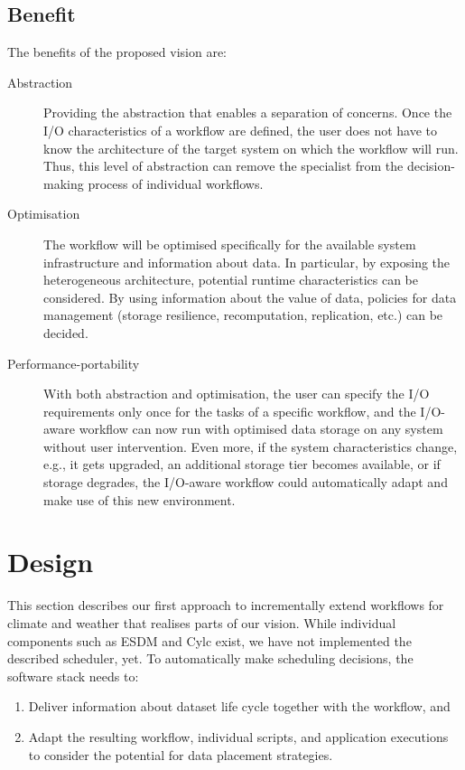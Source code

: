 \documentclass{superfri}
\begin{document}
\subsection{Benefit}

The benefits of the proposed vision are:

\begin{description}

\item[Abstraction] Providing the abstraction that enables a separation of concerns.
Once the I/O characteristics of a workflow are defined, the user does not have to know the architecture of the target system on which the workflow will run.
Thus, this level of abstraction can remove the specialist from the decision-making process of individual workflows.

\item[Optimisation] The workflow will be optimised specifically for the available system infrastructure and information about data.
In particular, by exposing the heterogeneous architecture, potential runtime characteristics can be considered.
By using information about the value of data, policies for data management (storage resilience,  recomputation, replication, etc.) can be decided.

\item[Performance-portability] With both abstraction and optimisation, the user can specify the I/O requirements only once for the tasks of a specific workflow, and the I/O-aware workflow can now run with optimised data storage on any system without user intervention.
Even more, if the system characteristics change, e.g., it gets upgraded, an additional storage tier becomes available, or if storage degrades, the I/O-aware workflow could automatically adapt and make use of this new environment.

\end{description}

\section{Design}
\label{sec:design}

This section describes our first approach to incrementally extend workflows for climate and weather that realises parts of our vision.
While individual components such as ESDM and Cylc exist, we have not implemented the described scheduler, yet.
To automatically make scheduling decisions, the software stack needs to: \vspace{0.3cm}
\begin{enumerate}
\item Deliver information about dataset life cycle together with the workflow, and
\item Adapt the resulting workflow, individual scripts, and application executions to consider the potential for data placement strategies.
\end{enumerate}
\end{document}
